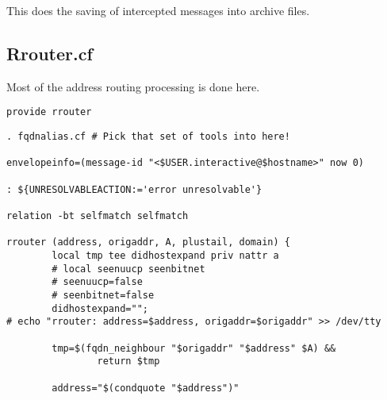 This does the saving of intercepted messages into archive files.










\subsection{Rrouter.cf}



Most of the address routing processing is done here.



\begin{tscreen}
\begin{verbatim}
provide rrouter
\end{verbatim}
\end{tscreen}


\begin{tscreen}
\begin{verbatim}
. fqdnalias.cf # Pick that set of tools into here!

envelopeinfo=(message-id "<$USER.interactive@$hostname>" now 0)

: ${UNRESOLVABLEACTION:='error unresolvable'}

relation -bt selfmatch selfmatch

rrouter (address, origaddr, A, plustail, domain) {
        local tmp tee didhostexpand priv nattr a
        # local seenuucp seenbitnet
        # seenuucp=false
        # seenbitnet=false
        didhostexpand="";
# echo "rrouter: address=$address, origaddr=$origaddr" >> /dev/tty

        tmp=$(fqdn_neighbour "$origaddr" "$address" $A) &&
                return $tmp

        address="$(condquote "$address")"
\end{verbatim}
\end{tscreen}

